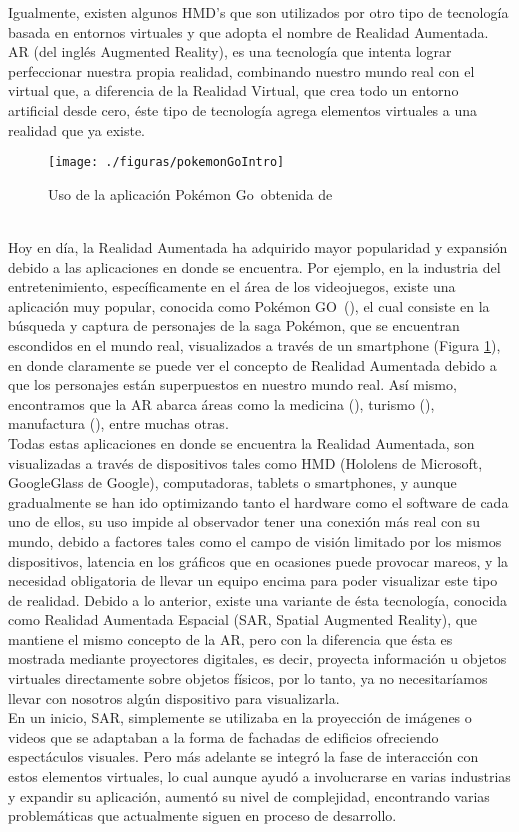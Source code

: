 \documentclass[a4paper,openright,12pt]{report}
\begin{document}
Igualmente, existen algunos HMD’s que son utilizados por otro tipo de tecnología basada en entornos virtuales y que adopta el nombre de Realidad Aumentada.\\
AR (del inglés Augmented Reality), es una tecnología que intenta lograr perfeccionar nuestra propia realidad, combinando nuestro mundo real con el virtual que, a diferencia de la Realidad Virtual, que crea todo un entorno artificial desde cero, éste tipo de tecnología agrega elementos virtuales a una realidad que ya existe.
\begin{figure}[h]
	\centering
	\texttt{[image: ./figuras/pokemonGoIntro]}
	\caption[Uso de la aplicación Pokémon Go\textcopyright ]{Uso de la aplicación Pokémon Go\textcopyright\ obtenida de \cite{Dorward2017}} \label{fig:pokemonGoIntro}
\end{figure}\\
Hoy en día, la Realidad Aumentada ha adquirido mayor popularidad y expansión debido a las aplicaciones en donde se encuentra. Por ejemplo, en la industria del entretenimiento, específicamente en el área de los videojuegos, existe una aplicación muy popular, conocida como Pokémon GO\textcopyright\ (\cite{Dorward2017}), el cual consiste en la búsqueda y captura de personajes de la saga Pokémon, que se encuentran escondidos en el mundo real, visualizados a través de un smartphone (Figura \ref{fig:pokemonGoIntro}), en donde claramente se puede ver el concepto de Realidad Aumentada debido a que los personajes están superpuestos en nuestro mundo real. Así mismo, encontramos que la AR abarca áreas como la medicina (\cite{Marescaux2004,Ploder1995}), turismo (\cite{Kounavis2012}), manufactura (\cite{Frund2004}), entre muchas otras.\\
Todas estas aplicaciones en donde se encuentra la Realidad Aumentada, son visualizadas a través de dispositivos tales como HMD (Hololens de Microsoft, GoogleGlass de Google), computadoras, tablets o smartphones, y aunque gradualmente se han ido optimizando tanto el hardware como el software de cada uno de ellos, su uso impide al observador tener una conexión más real con su mundo, debido a factores tales como el campo de visión limitado por los mismos dispositivos, latencia en los gráficos que en ocasiones puede provocar mareos, y la necesidad obligatoria de llevar un equipo encima para poder visualizar este tipo de realidad. Debido a lo anterior, existe una variante de ésta tecnología, conocida como Realidad Aumentada Espacial (SAR, Spatial Augmented Reality), que mantiene el mismo concepto de la AR, pero con la diferencia que ésta es mostrada mediante proyectores digitales, es decir, proyecta información u objetos virtuales directamente sobre objetos físicos, por lo tanto, ya no necesitaríamos llevar con nosotros algún dispositivo para visualizarla.\\
En un inicio, SAR, simplemente se utilizaba en la proyección de imágenes o videos que se adaptaban a la forma de fachadas de edificios ofreciendo espectáculos visuales. Pero más adelante se integró la fase de interacción con estos elementos virtuales, lo cual aunque ayudó a involucrarse en varias industrias y expandir su aplicación, aumentó su nivel de complejidad, encontrando varias problemáticas que actualmente siguen en proceso de desarrollo.
\end{document}
